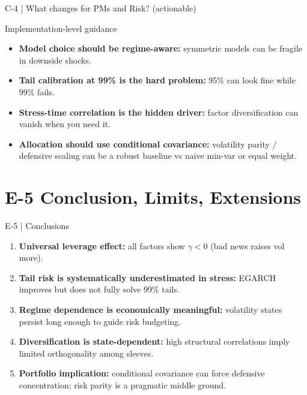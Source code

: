 \documentclass[aspectratio=169,10pt]{beamer}
\newcommand{\kpi}[1]{\textbf{\color{blue}#1}}
\begin{document}
\begin{frame}{C-4 | What changes for PMs and Risk? (actionable)}
\small
\begin{block}{Implementation-level guidance}
\begin{itemize}
  \item \kpi{Model choice should be regime-aware:} symmetric models can be fragile in downside shocks.
  \item \kpi{Tail calibration at 99\% is the hard problem:} 95\% can look fine while 99\% fails.
  \item \kpi{Stress-time correlation is the hidden driver:} factor diversification can vanish when you need it.
  \item \kpi{Allocation should use conditional covariance:} volatility parity / defensive scaling can be a robust baseline vs naive min-var or equal weight.
\end{itemize}
\end{block}

\end{frame}

\section{E-5 Conclusion, Limits, Extensions}

\begin{frame}{E-5 | Conclusions}
\small
\begin{enumerate}
  \item \kpi{Universal leverage effect:} all factors show $\gamma<0$ (bad news raises vol more).
  \item \kpi{Tail risk is systematically underestimated in stress:} EGARCH improves but does not fully solve 99\% tails.
  \item \kpi{Regime dependence is economically meaningful:} volatility states persist long enough to guide risk budgeting.
  \item \kpi{Diversification is state-dependent:} high structural correlations imply limited orthogonality among sleeves.
  \item \kpi{Portfolio implication:} conditional covariance can force defensive concentration; risk parity is a pragmatic middle ground.
\end{enumerate}
\end{frame}
\end{document}
